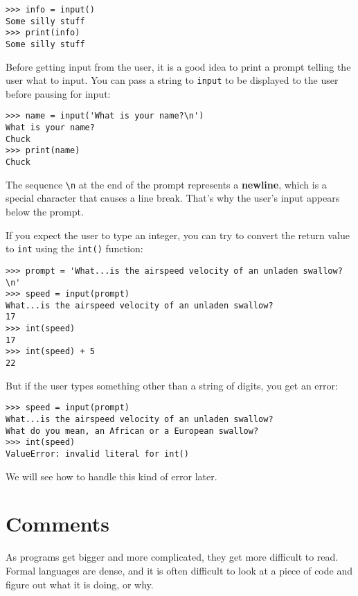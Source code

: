 
\beforeverb
\begin{verbatim}
>>> info = input()
Some silly stuff
>>> print(info)
Some silly stuff
\end{verbatim}
\afterverb
%
Before getting input from the user, it is a good idea to print a
prompt telling the user what to input.  You can pass a string
to \verb"input" to be displayed to the user before pausing
for input:


\beforeverb
\begin{verbatim}
>>> name = input('What is your name?\n')
What is your name?
Chuck
>>> print(name)
Chuck
\end{verbatim}
\afterverb
%
The sequence \verb"\n" at the end of the prompt represents a {\bf newline},
which is a special character that causes a line break.
That's why the user's input appears below the prompt.


If you expect the user to type an integer, you can try to convert
the return value to {\tt int} using the {\tt int()} function:

\beforeverb
\begin{verbatim}
>>> prompt = 'What...is the airspeed velocity of an unladen swallow?\n'
>>> speed = input(prompt)
What...is the airspeed velocity of an unladen swallow?
17
>>> int(speed)
17
>>> int(speed) + 5
22
\end{verbatim}
\afterverb
%
But if the user types something other than a string of digits,
you get an error:

\beforeverb
\begin{verbatim}
>>> speed = input(prompt)
What...is the airspeed velocity of an unladen swallow?
What do you mean, an African or a European swallow?
>>> int(speed)
ValueError: invalid literal for int()
\end{verbatim}
\afterverb
%
We will see how to handle this kind of error later.



\section{Comments}

As programs get bigger and more complicated, they get more difficult
to read.  Formal languages are dense, and it is often difficult to
look at a piece of code and figure out what it is doing, or why.

